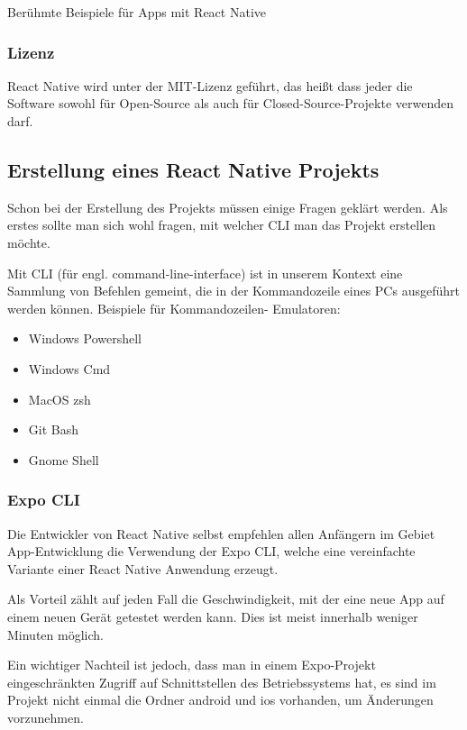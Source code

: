 \begin{center}
  Berühmte Beispiele für Apps mit React Native \cite{reactNativeShowcase}
\end{center}

\subsubsection{Lizenz}
React Native wird unter der MIT-Lizenz geführt, das heißt dass jeder die Software sowohl für
Open-Source als auch für Closed-Source-Projekte verwenden darf.

\subsection{Erstellung eines React Native Projekts}
Schon bei der Erstellung des Projekts müssen einige Fragen geklärt werden. Als erstes sollte man
sich wohl fragen, mit welcher CLI man das Projekt erstellen möchte.

Mit CLI (für engl. command-line-interface) ist in unserem Kontext eine Sammlung von Befehlen
gemeint, die in der Kommandozeile eines PCs ausgeführt werden können. Beispiele für Kommandozeilen-
Emulatoren:

\begin{itemize}
  \item Windows Powershell
  \item Windows Cmd
  \item MacOS zsh
  \item Git Bash
  \item Gnome Shell
\end{itemize}

\subsubsection{Expo CLI}
Die Entwickler von React Native selbst empfehlen allen Anfängern im Gebiet App-Entwicklung die
Verwendung der Expo CLI, welche eine vereinfachte Variante einer React Native Anwendung erzeugt.

Als Vorteil zählt auf jeden Fall die Geschwindigkeit, mit der eine neue App auf einem neuen Gerät
getestet werden kann. Dies ist meist innerhalb weniger Minuten möglich.

Ein wichtiger Nachteil ist jedoch, dass man in einem Expo-Projekt eingeschränkten Zugriff auf
Schnittstellen des Betriebssystems hat, es sind im Projekt nicht einmal die Ordner android und ios
vorhanden, um Änderungen vorzunehmen.

